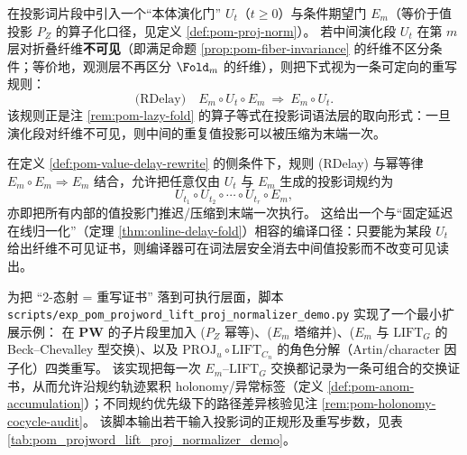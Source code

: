 \begin{definition}\label{def:pom-value-delay-rewrite}
在投影词片段中引入一个“本体演化门” \(U_t\)（\(t\ge 0\)）与条件期望门 \(E_m\)（等价于值投影 \(P_Z\) 的算子化口径，见定义 \ref{def:pom-proj-norm}）。
若中间演化段 \(U_t\) 在第 \(m\) 层对折叠纤维\textbf{不可见}（即满足命题 \ref{prop:pom-fiber-invariance} 的纤维不区分条件；等价地，观测层不再区分 \(\Fold_m\) 的纤维），则把下式视为一条可定向的重写规则：
$$
\text{(RDelay)}\quad
E_m\circ U_t\circ E_m\ \Longrightarrow\ E_m\circ U_t.
$$
该规则正是注 \ref{rem:pom-lazy-fold} 的算子等式在投影词语法层的取向形式：一旦演化段对纤维不可见，则中间的重复值投影可以被压缩为末端一次。
\end{definition}

\begin{remark}\label{rem:pom-value-delay-normal-form}
在定义 \ref{def:pom-value-delay-rewrite} 的侧条件下，规则 (RDelay) 与幂等律 \(E_m\circ E_m\Rightarrow E_m\) 结合，允许把任意仅由 \(U_t\) 与 \(E_m\) 生成的投影词规约为
$$
U_{t_1}\circ U_{t_2}\circ\cdots\circ U_{t_r}\circ E_m,
$$
亦即把所有内部的值投影门推迟/压缩到末端一次执行。
这给出一个与“固定延迟在线归一化”（定理 \ref{thm:online-delay-fold}）相容的编译口径：只要能为某段 \(U_t\) 给出纤维不可见证书，则编译器可在词法层安全消去中间值投影而不改变可见读出。
\end{remark}

\begin{remark}\label{rem:pom-projword-lift-proj-normalizer-demo}
为把 “\(2\)-态射 = 重写证书” 落到可执行层面，脚本 \texttt{scripts/exp\_pom\_projword\_lift\_proj\_normalizer\_demo.py} 实现了一个最小扩展示例：
在 \(\mathbf{PW}\) 的子片段里加入
(\(P_Z\) 幂等)、(\(E_m\) 塔缩并)、(\(E_m\) 与 \(\mathrm{LIFT}_G\) 的 Beck--Chevalley 型交换)、以及 \(\mathrm{PROJ}_u\circ \mathrm{LIFT}_{C_n}\) 的角色分解（Artin/character 因子化）四类重写。
该实现把每一次 \(E_m\)--\(\mathrm{LIFT}_G\) 交换都记录为一条可组合的交换证书，从而允许沿规约轨迹累积 holonomy/异常标签（定义 \ref{def:pom-anom-accumulation}）；不同规约优先级下的路径差异核验见注 \ref{rem:pom-holonomy-cocycle-audit}。
该脚本输出若干输入投影词的正规形及重写步数，见表 \ref{tab:pom_projword_lift_proj_normalizer_demo}。

\end{remark}

